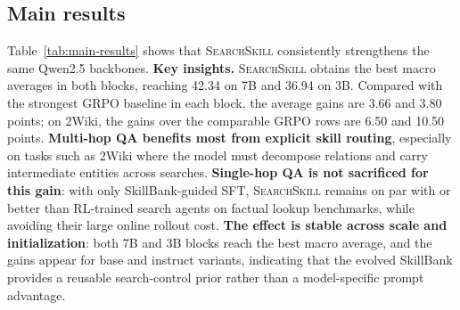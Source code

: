 \documentclass{article}
\newcommand{\Ours}{\textsc{SearchSkill}\xspace}
\begin{document}
\subsection{Main results}
Table~\ref{tab:main-results} shows that \Ours consistently strengthens the same Qwen2.5 backbones. \textbf{Key insights.} \Ours obtains the best macro averages in both blocks, reaching 42.34 on 7B and 36.94 on 3B. Compared with the strongest GRPO baseline in each block, the average gains are 3.66 and 3.80 points; on 2Wiki, the gains over the comparable GRPO rows are 6.50 and 10.50 points. \textbf{Multi-hop QA benefits most from explicit skill routing}, especially on tasks such as 2Wiki where the model must decompose relations and carry intermediate entities across searches. \textbf{Single-hop QA is not sacrificed for this gain}: with only SkillBank-guided SFT, \Ours remains on par with or better than RL-trained search agents on factual lookup benchmarks, while avoiding their large online rollout cost. \textbf{The effect is stable across scale and initialization}: both 7B and 3B blocks reach the best macro average, and the gains appear for base and instruct variants, indicating that the evolved SkillBank provides a reusable search-control prior rather than a model-specific prompt advantage.
\end{document}
